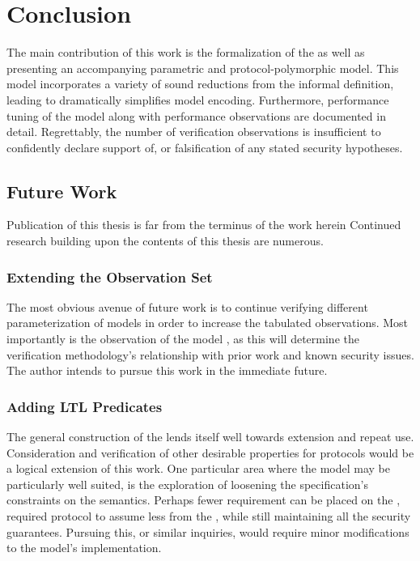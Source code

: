 \hypertarget{conclusion}{%
\chapter{Conclusion}\label{conclusion}}

The main contribution of this work is the formalization of the \CGKAsec as well as presenting an accompanying parametric and protocol-polymorphic  model.
This \CGKAmod{}{}{} model incorporates a variety of sound reductions from the informal \CGKAsec definition, leading to dramatically simplifies model encoding.
Furthermore, performance tuning of the model along with performance observations are documented in detail.
Regrettably, the number of verification observations is insufficient to confidently declare support of, or falsification of any stated security hypotheses.


\hypertarget{future-work}{%
\section{Future Work}\label{future-work}}

Publication of this thesis is far from the terminus of the work herein
Continued research building upon the contents of this thesis are numerous.


\hypertarget{more-observations}{%
\subsection{Extending the Observation Set}\label{more-observations}}

The most obvious avenue of future work is to continue verifying different parameterization of  models in order to increase the tabulated observations.
Most importantly is the observation of the model , as this will determine the verification methodology's relationship with prior work and known security issues.
The author intends to pursue this work in the immediate future.


\hypertarget{more-predicates}{%
\subsection{Adding LTL Predicates}\label{more-predicates}}

The general construction of the  lends itself well towards extension and repeat use.
Consideration and verification of other desirable properties for \CGKAdef protocols would be a logical extension of this work.
One particular area where the  model may be particularly well suited, is the exploration of loosening the  specification's constraints on the  semantics.
Perhaps fewer requirement can be placed on the , required protocol to assume less from the , while still maintaining all the  security guarantees.
Pursuing this, or similar inquiries, would require minor modifications to the  model's implementation.


